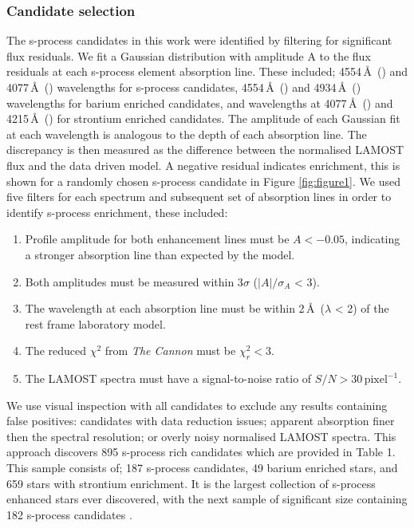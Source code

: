 \documentclass[a4paper,fleqn,usenatbib]{mnras}
\begin{document}
\subsubsection{Candidate selection} \label{sec:cand}
The s-process candidates in this work were identified by filtering for significant flux residuals. We fit a Gaussian distribution with amplitude A to the flux residuals at each s-process element absorption line. These included; 4554\,\AA\ () and 4077\,\AA\ () wavelengths for s-process candidates, 4554\,\AA\ () and 4934\,\AA\ () wavelengths for barium enriched candidates, and wavelengths at 4077\,\AA\ () and 4215\,\AA\ () for strontium enriched candidates. The amplitude of each Gaussian fit at each wavelength is analogous to the depth of each absorption line. The discrepancy is then measured as the difference between the normalised LAMOST flux and the data driven model. A negative residual indicates enrichment, this is shown for a randomly chosen s-process candidate in Figure \ref{fig:figure1}.
We used five filters for each spectrum and subsequent set of absorption lines in order to identify s-process enrichment, these included:

\renewcommand\labelenumi{(\roman{enumi})}
\renewcommand\theenumi\labelenumi

\begin{enumerate} 
\item Profile amplitude for both enhancement lines must be $A < -0.05$, indicating a stronger absorption line than expected by the model.
\item Both amplitudes must be measured within 3$\sigma$ ($|A|/\sigma _A$ < 3).
\item The wavelength at each absorption line must be within 2\,\AA\ ($\lambda$ < 2) of the rest frame laboratory model.
\item The reduced $\chi^2$ from \emph{The Cannon} must be $\chi_r^2 < 3$.
\item The LAMOST spectra must have a signal-to-noise ratio of $S/N > 30\,\textrm{pixel}^{-1}$.
\end{enumerate}
We use visual inspection with all candidates to exclude any results containing false positives: candidates with data reduction issues; apparent absorption finer then the spectral resolution; or overly noisy normalised LAMOST spectra. This approach discovers 895 s-process rich candidates which are provided in Table 1. This sample consists of; 187 s-process candidates, 49 barium enriched stars, and 659 stars with strontium enrichment. It is the largest collection of s-process enhanced stars ever discovered, with the next sample of significant size containing 182 s-process candidates \citep[e.g.,][]{decastro2016}. 
\end{document}
